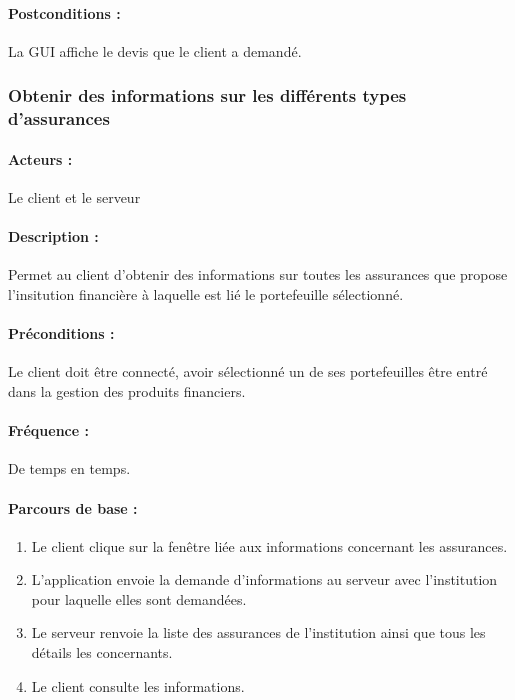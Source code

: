 \documentclass[../annexe.tex]{subfiles}
\begin{document}
\paragraph{Postconditions :} La GUI affiche le devis que le client a demandé.

\newpage

\subsubsection{Obtenir des informations sur les différents types 
d'assurances}

\paragraph{Acteurs :} Le client et le serveur 

\paragraph{Description :} Permet au client d'obtenir des informations sur toutes les assurances que propose l'insitution financière à laquelle est lié le portefeuille sélectionné.

\paragraph{Préconditions :} Le client doit être connecté, avoir sélectionné un  de ses portefeuilles être entré dans la gestion des produits financiers.

\paragraph{Fréquence :} De temps en temps.

\paragraph{Parcours de base :}

	\begin{enumerate}
		\item Le client clique sur la fenêtre liée aux informations concernant les assurances.
		\item L'application envoie la demande d'informations au serveur avec l'institution pour laquelle elles sont demandées.
		\item Le serveur renvoie la liste des assurances de l'institution ainsi que tous les détails les concernants.
		\item Le client consulte les informations.
	\end{enumerate}
	
\end{document}
